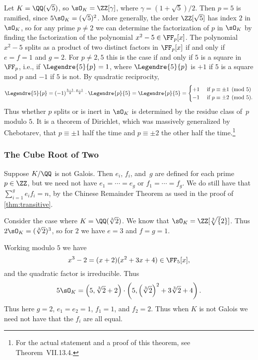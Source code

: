 \begin{example}\label{exam:decompQsqrt5}
  Let $K=\QQ(\sqrt{5})$, so $\sO_K=\ZZ[\gamma]$, where
  $\gamma=(1+\sqrt{5})/2$.  Then $p=5$ is ramified, since $5\sO_K =
    (\sqrt{5})^2$.  More generally, the order $\ZZ[\sqrt{5}]$ has index $2$
  in $\sO_K$, so for any prime $p\neq 2$ we can determine the
  factorization of $p$ in $\sO_K$ by finding the factorization of the
  polynomial $x^2-5\in \FF_p[x]$. The polynomial $x^2-5$ splits as a
  product of two distinct factors in $\FF_p[x]$ if and only if $e=f=1$
  and $g=2$. For $p\neq 2,5$ this is the case if and only if $5$ is a
  square in $\FF_p$, i.e., if $\Legendre{5}{p} = 1$, where $\Legendre{5}{p}$ is $+1$
  if $5$ is a square mod $p$ and $-1$ if $5$ is not.  By quadratic
  reciprocity,
  \[
    \Legendre{5}{p}
    = (-1)^{\frac{5-1}{2}\cdot \frac{p-1}{2}} \cdot \Legendre{p}{5}
    = \Legendre{p}{5}
    = \begin{cases}
      +1 & \text{ if } p \equiv \pm 1\pmod{5}  \\
      -1 & \text{ if } p \equiv \pm 2\pmod{5}.
    \end{cases}
  \]
  Thus whether $p$ splits or is inert in
  $\sO_K$ is determined by the residue class of~$p$
  modulo $5$. It is a theorem of Dirichlet, which was massively
  generalized by Chebotarev, that $p \equiv \pm 1$ half the time
  and $p \equiv \pm 2$ the other half the time.\footnote{
    For the actual statement and a proof of this theorem,
    see \cite{neukirch1999} Theorem~VII.13.4.}
\end{example}

\subsubsection{The Cube Root of Two}

Suppose $K/\QQ$ is not Galois.
Then $e_i$, $f_i$, and~$g$ are defined for each prime $p \in \ZZ$,
but we need not have $e_1=\cdots=e_g$ or $f_1=\cdots =f_g$.  We do still have that
$\sum_{i=1}^g e_i f_i = n$, by the Chinese Remainder Theorem as used in
the proof of \autoref{thm:transitive}.

Consider the case where $K=\QQ(\sqrt[3]{2})$. We know that $\sO_K = \ZZ[\sqrt[3]{2}]$.  Thus
$2\sO_K = (\sqrt[3]{2})^3$, so for $2$ we have $e=3$ and $f=g=1$.

Working modulo $5$ we have
\[
  x^3 - 2 = (x+2)(x^2+3x+4) \in \FF_5[x],
\]
and the quadratic factor is irreducible.  Thus
\[
  5\sO_K = \left(5, \sqrt[3]{2} + 2\right) \cdot
  \left(5, \left(\sqrt[3]{2}\right)^2 + 3\sqrt[3]{2} + 4\right).
\]
Thus here $g = 2$, $e_1 = e_2 = 1$, $f_1=1$, and $f_2 = 2$.
Thus when $K$ is not Galois we need not have that the $f_i$
are all equal.

